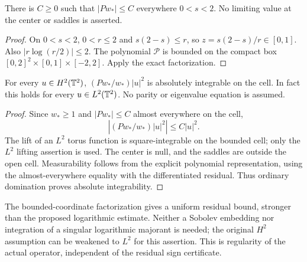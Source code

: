 \begin{lemma}
\label{lem:dd-ground-residual-bounded}
\leanok
There is $C\ge0$ such that $|Pw_*|\le C$ everywhere $0<s<2$.
No limiting value at the center or saddles is asserted.
\end{lemma}

\begin{proof}
\leanok
On $0<s<2$, $0<r\le2$ and $s(2-s)\le r$, so
$z=s(2-s)/r\in[0,1]$. Also $|r\log(r/2)|\le2$.
The polynomial $\mathcal P$ is bounded on the compact box
$[0,2]^2\times[0,1]\times[-2,2]$. Apply the exact factorization.
\end{proof}

\begin{lemma}
\label{lem:dd-picone-potential-integrable}
\leanok
For every $u\in H^2(\mathbb{T}^2)$, $(Pw_*/w_*)|u|^2$ is absolutely integrable
on the cell. In fact this holds for every $u\in L^2(\mathbb{T}^2)$.
No parity or eigenvalue equation is assumed.
\end{lemma}

\begin{proof}
\leanok
Since $w_*\ge1$ and $|Pw_*|\le C$ almost everywhere on the cell,
\[
 \left|(Pw_*/w_*)|u|^2\right|\le C|u|^2.
\]
The lift of an $L^2$ torus function is square-integrable on the bounded cell;
only the $L^2$ lifting assertion is used. The center is null, and the saddles
are outside the open cell. Measurability follows from the explicit polynomial
representation, using the almost-everywhere equality with the differentiated
residual. Thus ordinary domination proves absolute integrability.
\end{proof}

\begin{remark}
The bounded-coordinate factorization gives a uniform residual bound,
stronger than the proposed logarithmic estimate. Neither a Sobolev embedding
nor integration of a singular logarithmic majorant is needed; the original
$H^2$ assumption can be weakened to $L^2$ for this assertion.
This is regularity of the actual operator, independent of the residual
sign certificate.
\end{remark}

